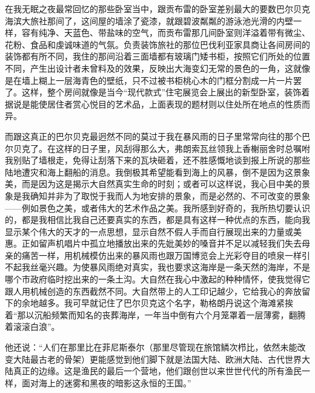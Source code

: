 \par 在我无眠之夜最常回忆的那些卧室当中，跟贡布雷的卧室差别最大的要数巴尔贝克海滨大旅社那间了，这间屋的墙涂了瓷漆，就跟碧波粼粼的游泳池光滑的内壁一样，容有纯净、天蓝色、带盐味的空气，而贡布雷那几间卧室则洋溢着带有微尘、花粉、食品和虔诚味道的气氛。负责装饰旅社的那位巴伐利亚家具商让各间房间的装饰都有所不同，我住的那间沿着三面墙都有玻璃门矮书柜，按照它们所处的位置不同，产生出设计者未曾料及的效果，反映出大海变幻无常的景色的一角，这就像是在墙上糊上一层海青色的壁纸，只不过被书柜桃心木的门框分割成一片一片罢了。这样，整个房间就像是当今“现代款式”住宅展览会上展出的新型卧室，装饰着据说是能使居住者赏心悦目的艺术品，上面表现的题材则以住处所在地点的性质而异。
\par 而跟这真正的巴尔贝克最迥然不同的莫过于我在暴风雨的日子里常常向往的那个巴尔贝克了。在这样的日子里，风刮得那么大，弗朗索瓦丝领我上香榭丽舍时总嘱咐我别贴了墙根走，免得让刮落下来的瓦块砸着，还不胜感慨地谈到报上所说的那些陆地遭灾和海上翻船的消息。我倒极其希望能看到海上的风暴，倒不是因为这景象美，而是因为这是揭示大自然真实生命的时刻；或者可以这样说，我心目中美的景象是我确知并非为了取悦于我而人为地安排的景象，而是必然的、不可改变的景象——例如景色之美，或者伟大的艺术作品之美。我所感到好奇的，我所热切要认识的，都是我相信比我自己还要真实的东西，都是具有这样一种优点的东西，能向我显示某个伟大的天才的一点思想，显示自然不假人手而自行展现出来的力量或美惠。正如留声机唱片中孤立地播放出来的先妣美妙的嗓音并不足以减轻我们失去母亲的痛苦一样，用机械模仿出来的暴风雨也跟万国博览会上光彩夺目的喷泉一样引不起我丝毫兴趣。为使暴风雨绝对真实，我也要求这海岸是一条天然的海岸，不是哪个市政府临时挖出来的一条土沟。大自然在我心中激起的种种情怀，使我觉得它跟人用机械创造的东西截然不同。大自然带上的人工印记越少，它给我心的奔放留下的余地越多。我可早就记住了巴尔贝克这个名字，勒格朗丹说这个海滩紧挨着“那以沉船频繁而知名的丧葬海岸，一年当中倒有六个月笼罩着一层薄雾，翻腾着滚滚白浪”。
\par 他还说：“人们在那里比在菲尼斯泰尔（那里尽管现在旅馆鳞次栉比，依然未能改变大陆最古老的骨架）更能感觉到他们脚下就是法国大陆、欧洲大陆、古代世界大陆真正的边缘。这是渔民的最后一个营地，他们跟创世以来世世代代的所有渔民一样，面对海上的迷雾和黑夜的暗影这永恒的王国。”
